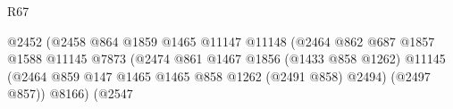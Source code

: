 \begin{lexlean}{R67}
\begin{coremodule}
                                                                      @2452
                                                                      (@2458
                                                                        @864
                                                                        @1859
                                                                        @1465
                                                                        @11147
                                                                        @11148
                                                                        (@2464
                                                                          @862
                                                                          @687
                                                                          @1857
                                                                          @1588
                                                                          @11145
                                                                          @7873
                                                                          (@2474
                                                                            @861
                                                                            @1467
                                                                            @1856
                                                                            (@1433 @858 @1262)
                                                                            @11145
                                                                            (@2464
                                                                              @859
                                                                              @147
                                                                              @1465
                                                                              @1465
                                                                              @858
                                                                              @1262
                                                                              (@2491 @858)
                                                                              @2494)
                                                                            (@2497 @857))
                                                                          @8166)
                                                                        (@2547

\end{coremodule}
\end{lexlean}
